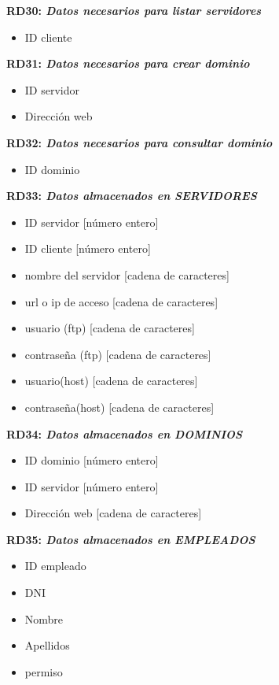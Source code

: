 \documentclass[paper=a4, fontsize=11pt, spanish]{scrartcl}
\begin{document}
\setlength{\parindent}{0em}
\textbf{RD30: \textit{Datos necesarios para listar servidores}}
\setlength{\parindent}{2em}
\begin{itemize}
  \item ID cliente
\end{itemize}

\setlength{\parindent}{0em}
\textbf{RD31: \textit{Datos necesarios para crear dominio}}
\setlength{\parindent}{2em}
\begin{itemize}
  \item ID servidor
  \item Dirección web
\end{itemize}

\setlength{\parindent}{0em}
\textbf{RD32: \textit{Datos necesarios para consultar dominio}}
\setlength{\parindent}{2em}
\begin{itemize}
  \item ID dominio
\end{itemize}

\setlength{\parindent}{0em}
\textbf{RD33: \textit{Datos almacenados en SERVIDORES}}
\setlength{\parindent}{2em}
\begin{itemize}
  \item ID servidor [número entero]
  \item ID cliente [número entero]
  \item nombre del servidor [cadena de caracteres]
  \item url o ip de acceso [cadena de caracteres]
  \item usuario (ftp) [cadena de caracteres]
  \item contraseña (ftp) [cadena de caracteres]
  \item usuario(host) [cadena de caracteres]
  \item contraseña(host) [cadena de caracteres]
\end{itemize}

\setlength{\parindent}{0em}
\textbf{RD34: \textit{Datos almacenados en DOMINIOS}}
\setlength{\parindent}{2em}
\begin{itemize}
  \item ID dominio [número entero]
  \item ID servidor [número entero]
  \item Dirección web [cadena de caracteres]
\end{itemize}

\setlength{\parindent}{0em}
\textbf{RD35: \textit{Datos almacenados en EMPLEADOS}}
\setlength{\parindent}{2em}
\begin{itemize}
  \item ID empleado
  \item DNI
  \item Nombre
  \item Apellidos
  \item permiso
\end{itemize}
\end{document}
